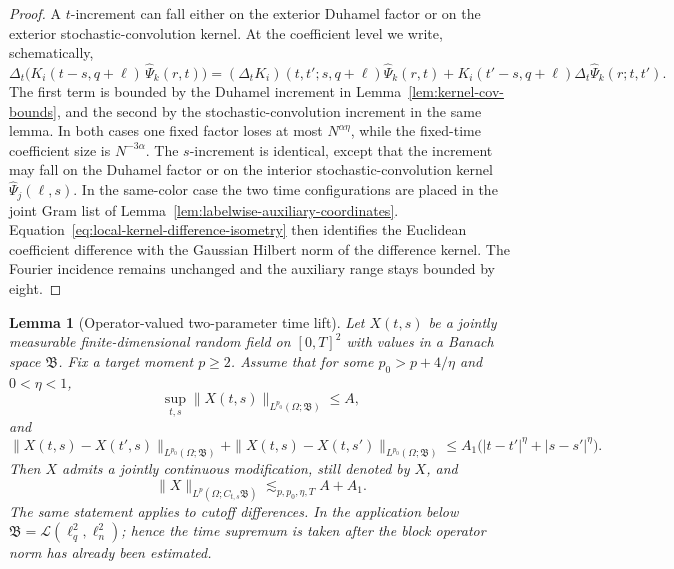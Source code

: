 \documentclass[10pt]{amsart}
\numberwithin{equation}{section}
\theoremstyle{plain}
\newtheorem{lemma}[theorem]{Lemma}
\theoremstyle{definition}
\theoremstyle{remark}
\begin{document}
\begin{proof}
A $t$-increment can fall either on the exterior Duhamel factor or on the exterior stochastic-convolution kernel.  At the coefficient level we write, schematically,
\[
        \Delta_t\bigl(K_i(t-s,q+\ell)\,\widehat\Psi_k(r,t)\bigr)
        = (\Delta_t K_i)(t,t';s,q+\ell)\widehat\Psi_k(r,t)
          + K_i(t'-s,q+\ell)\Delta_t\widehat\Psi_k(r;t,t').
\]
The first term is bounded by the Duhamel increment in Lemma~\ref{lem:kernel-cov-bounds}, and the second by the stochastic-convolution increment in the same lemma.  In both cases one fixed factor loses at most $N^{\alpha\eta}$, while the fixed-time coefficient size is $N^{-3\alpha}$.  The $s$-increment is identical, except that the increment may fall on the Duhamel factor or on the interior stochastic-convolution kernel $\widehat\Psi_j(\ell,s)$.  In the same-color case the two time configurations are placed in the joint Gram list of Lemma~\ref{lem:labelwise-auxiliary-coordinates}.  Equation~\eqref{eq:local-kernel-difference-isometry} then identifies the Euclidean coefficient difference with the Gaussian Hilbert norm of the difference kernel.  The Fourier incidence remains unchanged and the auxiliary range stays bounded by eight.
\end{proof}

\begin{lemma}[Operator-valued two-parameter time lift]\label{lem:operator-valued-time-lift}
Let $X(t,s)$ be a jointly measurable finite-dimensional random field on $[0,T]^2$ with values in a Banach space ${\mathfrak B}$.  Fix a target moment $p\ge2$.  Assume that for some $p_0>p+4/\eta$ and $0<\eta<1$,
\[
        \sup_{t,s}\|X(t,s)\|_{L^{p_0}(\Omega;\mathfrak B)}\le A,
\]
and
\[
        \|X(t,s)-X(t',s)\|_{L^{p_0}(\Omega;\mathfrak B)}
        +\|X(t,s)-X(t,s')\|_{L^{p_0}(\Omega;\mathfrak B)}
        \le A_1\bigl(|t-t'|^\eta+|s-s'|^\eta\bigr).
\]
Then $X$ admits a jointly continuous modification, still denoted by $X$, and
\[
        \|X\|_{L^p(\Omega;C_{t,s}\mathfrak B)}
        \lesssim_{p,p_0,\eta,T} A+A_1.
\]
The same statement applies to cutoff differences.  In the application below ${\mathfrak B}=\mathcal L(\ell_q^2,\ell_n^2)$; hence the time supremum is taken after the block operator norm has already been estimated.
\end{lemma}
\end{document}
